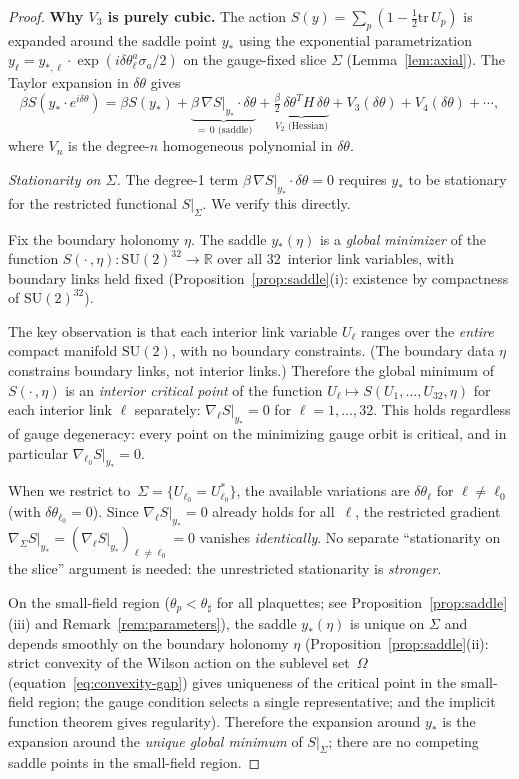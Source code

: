 \documentclass[11pt]{article}
\theoremstyle{definition}
\newcommand{\SU}{\mathrm{SU}}
\newcommand{\tr}{\mathrm{tr}}
\newcommand{\R}{\mathbb{R}}
\begin{document}
\begin{proof}
\textbf{Why $V_3$ is purely cubic.}
The action $S(y)=\sum_p(1-\frac{1}{2}\tr\,U_p)$ is expanded around
the saddle point $y_*$ using the exponential parametrization
$y_\ell=y_{*,\ell}\cdot\exp(i\delta\theta_\ell^a\sigma_a/2)$ on
the gauge-fixed slice $\Sigma$
(Lemma~\ref{lem:axial}).  The Taylor expansion in
$\delta\theta$ gives
\begin{equation}\label{eq:Sexpand}
\beta S(y_*\cdot e^{i\delta\theta})
=\beta S(y_*)+\underbrace{\beta\,\nabla S|_{y_*}\cdot\delta\theta}%
_{=\,0\text{ (saddle)}}
+\underbrace{\tfrac{\beta}{2}\,\delta\theta^T H\,\delta\theta}%
_{V_2\text{ (Hessian)}}
+V_3(\delta\theta)+V_4(\delta\theta)+\cdots,
\end{equation}
where $V_n$ is the degree-$n$ homogeneous polynomial in $\delta\theta$.

\emph{Stationarity on $\Sigma$.}
The degree-1 term $\beta\,\nabla S|_{y_*}\cdot\delta\theta=0$
requires $y_*$ to be stationary for the restricted functional
$S|_\Sigma$.  We verify this directly.

Fix the boundary holonomy $\eta$.  The saddle $y_*(\eta)$ is
a \emph{global minimizer} of the function
$S(\cdot\,,\eta):\SU(2)^{32}\to\R$ over all
32~interior link variables, with boundary links held fixed
(Proposition~\ref{prop:saddle}(i): existence by compactness of
$\SU(2)^{32}$).

The key observation is that each interior link variable
$U_\ell$ ranges over the \emph{entire} compact manifold $\SU(2)$,
with no boundary constraints.  (The boundary data $\eta$
constrains boundary links, not interior links.)
Therefore the global minimum of $S(\cdot\,,\eta)$ is an
\emph{interior critical point} of the function
$U_\ell\mapsto S(U_1,\ldots,U_{32},\eta)$ for each interior
link $\ell$ separately: $\nabla_\ell S|_{y_*}=0$ for
$\ell=1,\ldots,32$.  This holds regardless of gauge
degeneracy: every point on the minimizing gauge orbit is
critical, and in particular $\nabla_{\ell_0}S|_{y_*}=0$.

When we restrict to~$\Sigma=\{U_{\ell_0}=U_{\ell_0}^*\}$, the
available variations are $\delta\theta_\ell$ for $\ell\ne\ell_0$
(with $\delta\theta_{\ell_0}=0$).  Since
$\nabla_\ell S|_{y_*}=0$ already holds for all~$\ell$, the
restricted gradient $\nabla_\Sigma S|_{y_*}
=(\nabla_\ell S|_{y_*})_{\ell\ne\ell_0}=0$ vanishes
\emph{identically}.  No separate ``stationarity on the
slice'' argument is needed: the unrestricted stationarity is
\emph{stronger}.

On the small-field
region ($\theta_p<\theta_\sharp$ for all plaquettes;
see Proposition~\ref{prop:saddle}(iii) and
Remark~\ref{rem:parameters}), the
saddle $y_*(\eta)$ is unique on $\Sigma$ and
depends smoothly on the boundary holonomy $\eta$
(Proposition~\ref{prop:saddle}(ii): strict convexity of the
Wilson action on the sublevel set~$\Omega$
(equation~\eqref{eq:convexity-gap}) gives
uniqueness of the critical point in the small-field region;
the gauge condition selects a single
representative; and the implicit function theorem gives regularity).
Therefore the expansion around $y_*$ is the expansion around the
\emph{unique global minimum} of $S|_\Sigma$; there are no
competing saddle points in the small-field region.


\end{proof}
\end{document}
